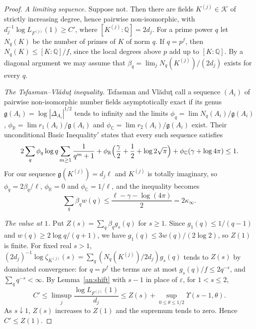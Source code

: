 \documentclass[11pt]{amsart}
\numberwithin{equation}{section}
\theoremstyle{definition}
\theoremstyle{remark}
\newcommand{\Q}{\mathbb Q}
\newcommand{\R}{\mathbb R}
\newcommand{\C}{\mathbb C}
\begin{document}
\begin{proof}
\emph{A limiting sequence.} Suppose not. Then there are fields $K^{(j)}\in\mathcal K$ of strictly
increasing degree, hence pairwise non-isomorphic, with
$d_j^{-1}\log L_{F^{(j)}}(1)\ge C'$, where $[K^{(j)}:\Q]=2d_j$. For a prime power $q$
let $N_q(K)$ be the number of primes of $K$ of norm $q$. If $q=p^f$, then
$N_q(K)\le[K:\Q]/f$, since the local degrees above $p$ add up to $[K:\Q]$.
By a diagonal argument we may assume that
$\beta_q=\lim_jN_q(K^{(j)})/(2d_j)$ exists for every $q$.

\emph{The Tsfasman--Vl\u{a}du\c{t} inequality.} Tsfasman and
Vl\u{a}du\c{t} call a sequence $(A_i)$ of pairwise
non-isomorphic number fields asymptotically exact if its genus
$\mathfrak g(A_i)=\log|\Delta_{A_i}|^{1/2}$ tends to infinity and the limits
$\phi_q=\lim N_q(A_i)/\mathfrak g(A_i)$,
$\phi_\R=\lim r_1(A_i)/\mathfrak g(A_i)$ and
$\phi_\C=\lim r_2(A_i)/\mathfrak g(A_i)$ exist. Their unconditional Basic
Inequality$'$ \cite[Section~3.2, Proposition~3.1]{TsfasmanVladut2002} states
that every such sequence satisfies
\[
 2\sum_q\phi_q\log q\sum_{m\ge1}\frac1{q^m+1}
 +\phi_\R\Bigl(\frac\gamma2+\frac12+\log2\sqrt\pi\Bigr)
 +\phi_\C(\gamma+\log4\pi)\le1.
\]
For our sequence $\mathfrak g(K^{(j)})=d_j\ell$ and $K^{(j)}$ is totally imaginary, so
$\phi_q=2\beta_q/\ell$, $\phi_\R=0$ and $\phi_\C=1/\ell$, and the inequality
becomes
\begin{equation}\label{an:tv-budget}
 \sum_q\beta_qw(q)\le\frac{\ell-\gamma-\log(4\pi)}2=2\kappa_\infty.
\end{equation}

\emph{The value at $1$.} Put $Z(s)=\sum_q\beta_qg_s(q)$ for $s\ge1$. Since $g_1(q)\le1/(q-1)$ and
$w(q)\ge2\log q/(q+1)$, we have $g_1(q)\le3w(q)/(2\log2)$, so $Z(1)$ is
finite. For fixed real $s>1$,
$(2d_j)^{-1}\log\zeta_{K^{(j)}}(s)=\sum_q(N_q(K^{(j)})/2d_j)g_s(q)$ tends to $Z(s)$ by
dominated convergence: for $q=p^f$ the terms are at most
$g_s(q)/f\le2q^{-s}$, and $\sum_q q^{-s}<\infty$. By Lemma~\ref{an:shift}
with $s-1$ in place of $\varepsilon$, for $1<s\le2$,
\[
 C'\le\limsup_j\frac{\log L_{F^{(j)}}(1)}{d_j}
 \le Z(s)+\sup_{0\le\theta\le1/2}\Upsilon(s-1,\theta).
\]
As $s\downarrow1$, $Z(s)$ increases to $Z(1)$ and the supremum tends to
zero. Hence $C'\le Z(1)$.


\end{proof}
\end{document}
